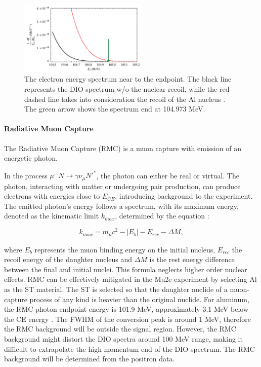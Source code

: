 \begin{figure}[!h]
\centering
\includegraphics[width =0.55\textwidth]{figures/png/Screenshot_20240909_141143.png}
\caption[The electron energy spectrum near to the endpoint.]{The electron energy spectrum near to the endpoint. The black line 
represents the DIO spectrum w/o the nuclear recoil, while the red 
dashed line takes into consideration the recoil of the Al nucleus 
\cite{PhysRevD.84.013006}. The green arrow shows the spectrum end at 104.973 MeV.
}
\label{fig:micheldiff}
\end{figure}


\paragraph{Radiative Muon Capture}
The Radiative Muon Capture (RMC) is a muon capture with emission of an energetic photon.

In the process $\mu^- N \rightarrow\gamma \nu_\mu N'^* $, 
the photon can either be real or virtual. The photon, interacting with matter or 
undergoing pair production, can produce electrons with energies close to $E_{CE}$, 
introducing background to the experiment. The emitted photon's energy follows 
a spectrum, with its maximum energy, denoted as the kinematic limit $k_{max}$, 
determined by the equation \cite{bartoszek2015mu2e}:

\begin{equation}
k_{max} = m_\mu c^2 - |E_b| - E_{rec} - \Delta M ,
\end{equation}

where $E_b$ represents the muon binding energy on the initial nucleus, $E_{rec}$  
the recoil energy of the daughter nucleus and $\Delta M$ is the rest energy difference 
between the final and initial nuclei. This formula neglects higher order nuclear effects. 
RMC can be effectively mitigated in the Mu2e experiment by 
selecting Al as the ST material. The ST is selected so that the daughter nuclide of a muon-capture 
process of any kind is heavier than the original nuclide. For aluminum, the RMC photon 
endpoint energy is 101.9 MeV, approximately 3.1 MeV below the CE energy 
\cite{bartoszek2015mu2e}. 
The FWHM of the conversion peak is around 1 MeV, therefore the RMC background will be 
outside the signal region. However, the RMC background might distort the DIO spectra 
around 100 MeV range, making it difficult to extrapolate the high momentum end of the DIO spectrum. 
The RMC background will be determined from the positron data.


